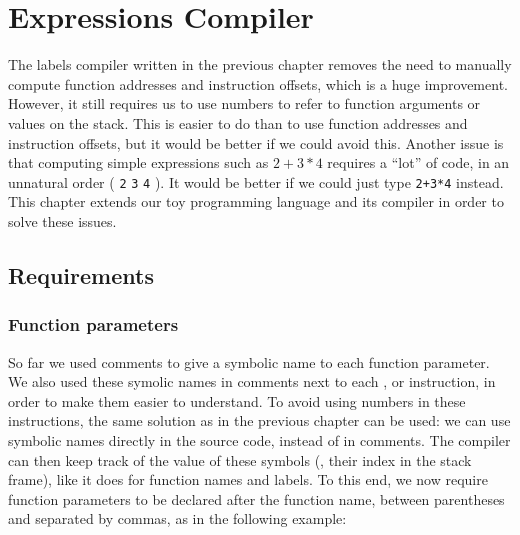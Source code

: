 
\renewcommand{\rustfile}{chapter5}
\setcounter{rustid}{0}


\chapter{Expressions Compiler}\label{chapter:expressions-compiler}

The labels compiler written in the previous chapter removes the need to
manually compute function addresses and instruction offsets, which is a huge
improvement. However, it still requires us to use numbers to refer to function
arguments or values on the stack. This is easier to do than to use function
addresses and instruction offsets, but it would be better if we could avoid
this. Another issue is that computing simple expressions such as $2+3*4$
requires a ``lot'' of code, in an unnatural order ( {\tt 2}
 {\tt 3}  {\tt 4}  ). It would be
better if we could just type {\tt 2+3*4} instead. This chapter extends our toy
programming language and its compiler in order to solve these issues.

\section{Requirements}

\subsection{Function parameters}\label{subsubsection:toyc5-fn-params}

So far we used comments to give a symbolic name to each function parameter. We
also used these symolic names in comments next to each , 
or  instruction, in order to make them easier to understand. To avoid
using numbers in these instructions, the same solution as in the previous
chapter can be used: we can use symbolic names directly in the source code,
instead of in comments. The compiler can then keep track of the value of these
symbols (\ie, their index in the stack frame), like it does for function names
and labels. To this end, we now require function parameters to be declared
after the function name, between parentheses and separated by commas, as in the
following example:

